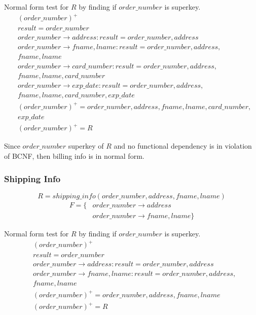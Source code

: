 \documentclass[fleqn]{scrreprt}
\begin{document}
Normal form test for $R$ by finding if $order\_number$ is superkey.
\begin{align*}
    & (order\_number)^+\\
    & result = order\_number\\
    & order\_number \rightarrow address : result = order\_number, address\\
    & order\_number \rightarrow fname, lname : result = order\_number, address,\\
    & fname, lname\\
    & order\_number \rightarrow card\_number : result = order\_number, address,\\
    & fname, lname, card\_number\\
    & order\_number \rightarrow exp\_date : result = order\_number, address,\\
    & fname, lname, card\_number, exp\_date\\
    & (order\_number)^+ = order\_number, address, fname, lname, card\_number,\\
    & exp\_date\\
    & (order\_number)^+ = R
\end{align*}

Since $order\_number$ superkey of $R$ and no functional dependency is in violation
of BCNF, then billing info is in normal form.

\subsubsection{Shipping Info}
\begin{equation*}
    R = shipping\_info(order\_number, address, fname, lname)
\end{equation*}
\begin{align*}
    F = \{ & order\_number \rightarrow address\\
           & order\_number \rightarrow fname, lname \}
\end{align*}

Normal form test for $R$ by finding if $order\_number$ is superkey.
\begin{align*}
    & (order\_number)^+\\
    & result = order\_number\\
    & order\_number \rightarrow address : result = order\_number, address\\
    & order\_number \rightarrow fname, lname : result = order\_number, address,\\
    & fname, lname\\
    & (order\_number)^+ = order\_number, address, fname, lname\\
    & (order\_number)^+ = R
\end{align*}
\end{document}
